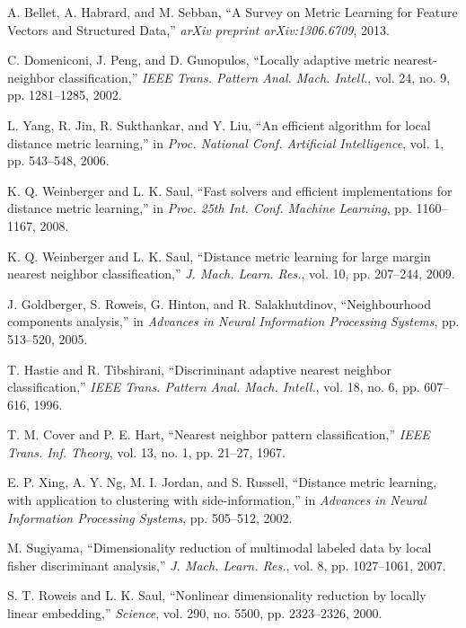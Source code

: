 \documentclass[review]{elsarticle}
\begin{document}
\begin{thebibliography}{50}

A. Bellet, A. Habrard, and M. Sebban, ``A Survey on Metric Learning for Feature Vectors and Structured Data,'' \emph{arXiv preprint arXiv:1306.6709}, 2013.

C. Domeniconi, J. Peng, and D. Gunopulos, ``Locally adaptive metric nearest-neighbor classification,'' \emph{IEEE Trans. Pattern Anal. Mach. Intell.}, vol. 24, no. 9, pp. 1281--1285, 2002.

L. Yang, R. Jin, R. Sukthankar, and Y. Liu, ``An efficient algorithm for local distance metric learning,'' in \emph{Proc. National Conf. Artificial Intelligence}, vol. 1, pp. 543--548, 2006.

K. Q. Weinberger and L. K. Saul, ``Fast solvers and efficient implementations for distance metric learning,'' in \emph{Proc. 25th Int. Conf. Machine Learning}, pp. 1160--1167, 2008.

K. Q. Weinberger and L. K. Saul, ``Distance metric learning for large margin nearest neighbor classification,'' \emph{J. Mach. Learn. Res.}, vol. 10, pp. 207--244, 2009.

J. Goldberger, S. Roweis, G. Hinton, and R. Salakhutdinov, ``Neighbourhood components analysis,'' in \emph{Advances in Neural Information Processing Systems}, pp. 513--520, 2005.

T. Hastie and R. Tibshirani, ``Discriminant adaptive nearest neighbor classification,'' \emph{IEEE Trans. Pattern Anal. Mach. Intell.}, vol. 18, no. 6, pp. 607--616, 1996.

T. M. Cover and P. E. Hart, ``Nearest neighbor pattern classification,'' \emph{IEEE Trans. Inf. Theory}, vol. 13, no. 1, pp. 21--27, 1967.

E. P. Xing, A. Y. Ng, M. I. Jordan, and S. Russell, ``Distance metric learning, with application to clustering with side-information,'' in \emph{Advances in Neural Information Processing Systems}, pp. 505--512, 2002.

M. Sugiyama, ``Dimensionality reduction of multimodal labeled data by local fisher discriminant analysis,'' \emph{J. Mach. Learn. Res.}, vol. 8, pp. 1027--1061, 2007.

S. T. Roweis and L. K. Saul, ``Nonlinear dimensionality reduction by locally linear embedding,'' \emph{Science}, vol. 290, no. 5500, pp. 2323--2326, 2000.


\end{thebibliography}
\end{document}
